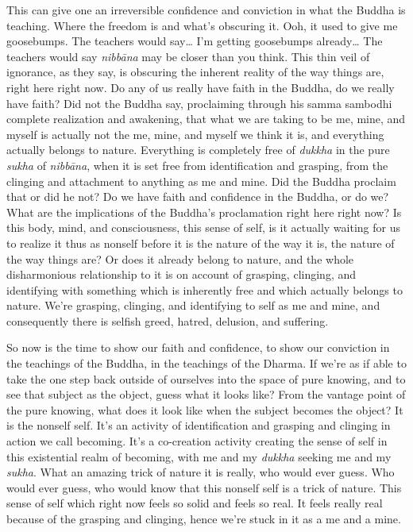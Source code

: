 \documentclass[12pt,openany]{book}
\begin{document}
This can give one an irreversible confidence and conviction in \linebreak what the Buddha is teaching. Where the freedom is and what's obscuring it. Ooh, it used to give me goosebumps. The teachers would say… I’m getting goosebumps already… The teachers would say \textit{nibbāna} may be closer than you think. This thin veil of ignorance, as they say, is obscuring the inherent reality of the way things are, right here right now. Do any of us really have faith in the Buddha, do we really have faith? Did not the Buddha say, proclaiming through his samma sambodhi complete realization and awakening, that what we are taking to be me, mine, and myself is actually not the me, mine, and myself we think it is, and everything actually belongs to nature. Everything is completely free of \textit{dukkha} in the pure \textit{sukha} of \textit{nibbāna}, when it is set free from identification and grasping, from the clinging and attachment to anything as me and mine. Did the Buddha proclaim that or did he not? Do we have faith and confidence in the Buddha, or do we? What are the implications of the Buddha’s proclamation right here right now? Is this body, mind, and consciousness, this sense of self, is it actually waiting for us to realize it thus as nonself before it is the nature of the way it is, the nature of the way things are? Or does it already belong to nature, and the whole disharmonious relationship to it is on account of grasping, clinging, and identifying with something which is inherently free and which actually belongs to nature. We’re grasping, clinging, and identifying to self as me and mine, and consequently there is selfish greed, hatred, delusion, and suffering. 

So now is the time to show our faith and confidence, to show our conviction in the teachings of the Buddha, in the teachings of the Dharma. If we’re as if able to take the one step back outside of ourselves into the space of pure knowing, and to see that subject as the object, guess what it looks like? From the vantage point of the pure knowing, what does it look like when the subject becomes the object? It is the nonself self. It's an activity of identification and grasping and clinging in action we call becoming. It's a co-creation activity creating the sense of self in this existential realm of becoming, with me and my \textit{dukkha} seeking me and my \textit{sukha}. What an amazing trick of nature it is really, who would ever guess. Who would ever guess, who would know that this nonself self is a trick of nature. This sense of self which right now feels so solid and feels so real. It feels really real because of the grasping and clinging, hence we're stuck in it as a me and a mine.
\end{document}
